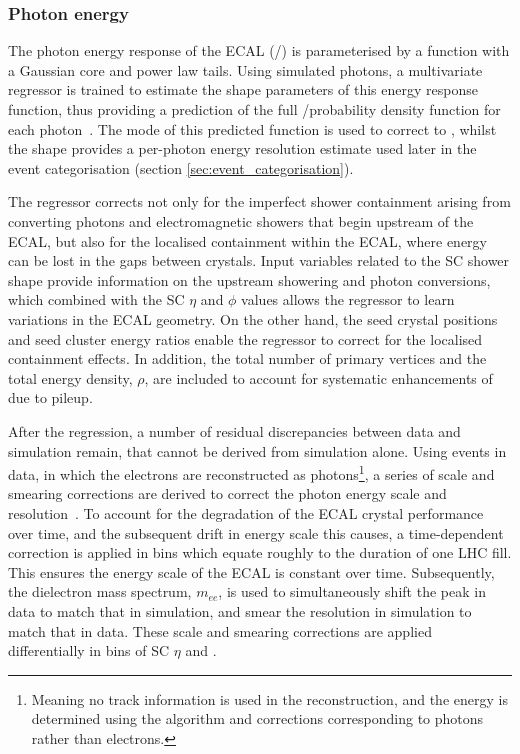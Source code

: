 \subsubsection{Photon energy}
The photon energy response of the ECAL (\Etrue/\Eraw) is parameterised by a function with a Gaussian core and power law tails. Using simulated photons, a multivariate regressor is trained to estimate the shape parameters of this energy response function, thus providing a prediction of the full \Etrue/\Eraw probability density function for each photon~\cite{Khachatryan:2015iwa}. The mode of this predicted function is used to correct \Eraw to \Etrue, whilst the shape provides a per-photon energy resolution estimate used later in the event categorisation (section \ref{sec:event_categorisation}).

The regressor corrects not only for the imperfect shower containment arising from converting photons and electromagnetic showers that begin upstream of the ECAL, but also for the localised containment within the ECAL, where energy can be lost in the gaps between crystals. Input variables related to the SC shower shape provide information on the upstream showering and photon conversions, which combined with the SC $\eta$ and $\phi$ values allows the regressor to learn variations in the ECAL geometry. On the other hand, the seed crystal positions and seed cluster energy ratios enable the regressor to correct for the localised containment effects. In addition, the total number of primary vertices and the total energy density, $\rho$, are included to account for systematic enhancements of \Eraw due to pileup.

After the regression, a number of residual discrepancies between data and simulation remain, that cannot be derived from simulation alone. Using \Zee events in data, in which the electrons are reconstructed as photons\footnote{Meaning no track information is used in the reconstruction, and the energy is determined using the algorithm and corrections corresponding to photons rather than electrons.}, a series of scale and smearing corrections are derived to correct the photon energy scale and resolution~\cite{Sirunyan:2020xwk}. To account for the degradation of the ECAL crystal performance over time, and the subsequent drift in energy scale this causes, a time-dependent correction is applied in bins which equate roughly to the duration of one LHC fill. This ensures the energy scale of the ECAL is constant over time. Subsequently, the dielectron mass spectrum, $m_{ee}$, is used to simultaneously shift the peak in data to match that in simulation, and smear the resolution in simulation to match that in data. These scale and smearing corrections are applied differentially in bins of SC $\eta$ and \RNINE. 

